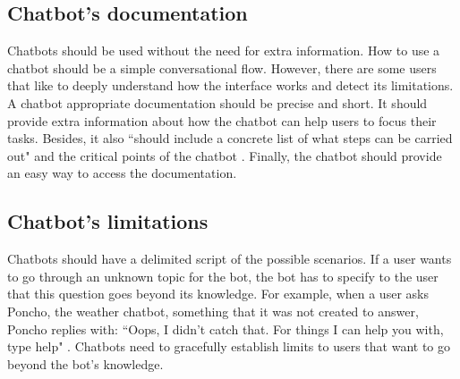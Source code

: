 \documentclass[a4paper,10pt]{article}
\begin{document}

\subsection*{Chatbot's documentation}

Chatbots should be used without the need for extra information. How to use a chatbot should be a simple conversational flow. However, there are some users that like to deeply understand how the interface works and detect its limitations. A chatbot appropriate documentation should be precise and short. It should provide extra information about how the chatbot can help users to focus their tasks. Besides, it also ``should include a concrete list of what steps can be carried out" and the critical points of the chatbot \cite{HeuristicsWebPage}. Finally, the chatbot should provide an easy way to access the documentation.   

\subsection*{Chatbot's limitations}

Chatbots should have a delimited script of the possible scenarios. If a user wants to go through an unknown topic for the bot, the bot has to specify to the user that this question goes beyond its knowledge. For example, when a user asks Poncho, the weather chatbot, something that it was not created to answer, Poncho replies with: ``Oops, I didn't catch that. For things I can help you with, type help" \cite{HeuristicsWebPage}. Chatbots need to gracefully establish limits to users that want to go beyond the bot's knowledge.  

\medskip


\end{document}
